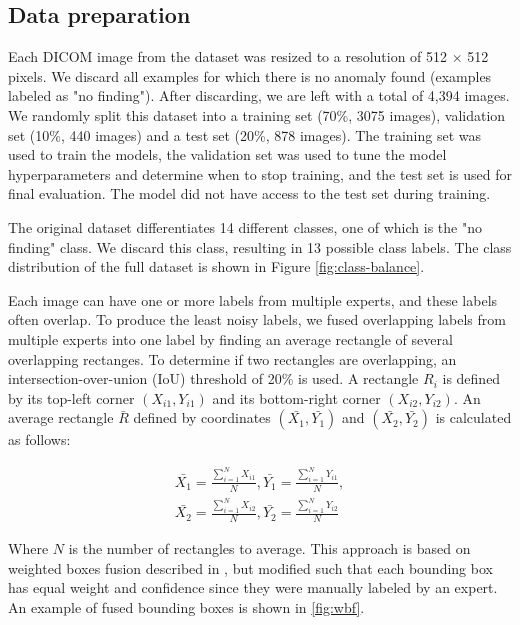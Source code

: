 \documentclass[conference]{IEEEtran}
\begin{document}
\subsection{Data preparation}

Each DICOM image from the dataset was resized to a resolution of 512 $\times$ 512 pixels. We 
discard all examples for which there is no anomaly found (examples labeled as "no finding"). After 
discarding, we are left with a total of 4,394 images. We randomly split this dataset into a 
training set (70\%, 3075 images), validation set (10\%, 440 images) and a test set (20\%, 878 
images). The training set was used to train the models, the validation set was used to tune the 
model hyperparameters and determine when to stop training, and the test set is used for final 
evaluation. The model did not have access to the test set during training.

The original dataset differentiates 14 different classes, one of which is the "no finding" class. 
We discard this class, resulting in 13 possible class labels. The class distribution of the full dataset is shown in Figure \ref{fig:class-balance}.


Each image can have one or more 
labels from multiple experts, and these labels often overlap. To produce the least noisy labels, 
we fused overlapping labels from multiple experts into one label by finding an average rectangle 
of several overlapping rectanges. To determine if two rectangles are overlapping, an intersection-over-union 
(IoU) threshold of 20\% is used. A rectangle ${R_i}$ is defined by its top-left corner 
$(X_{i1}, Y_{i1})$ and its bottom-right corner $(X_{i2}, Y_{i2})$. An average rectangle $\bar{R}$ 
defined by coordinates $(\bar{X_{1}}, \bar{Y_{1}})$ and $(\bar{X_{2}}, \bar{Y_{2}})$ is calculated as follows:

\begin{align}
\bar{X_1} = \frac{\sum_{i=1}^{N} X_{i1}}{N}, \bar{Y_1} = \frac{\sum_{i=1}^{N} Y_{i1}}{N},\\
\bar{X_2} = \frac{\sum_{i=1}^{N} X_{i2}}{N}, \bar{Y_2} = \frac{\sum_{i=1}^{N} Y_{i2}}{N} \nonumber
\end{align}


Where $N$ is the number of rectangles to average. This approach is based on weighted boxes fusion 
described in \cite{solovyevWeightedBoxesFusion2021}, but modified such that each bounding box has 
equal weight and confidence since they were manually labeled by an expert. An example of fused 
bounding boxes is shown in \ref{fig:wbf}.
\end{document}
